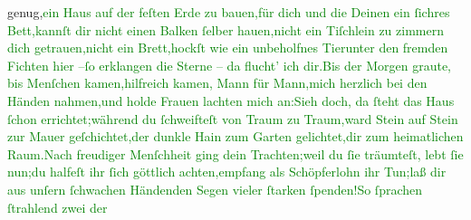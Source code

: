 {                     genug,}{}\ledrightnote{\textcolor{green}{Das Haus des Dichters}}\newverse{}\textcolor{green}{ein Haus auf der feſten Erde zu bauen,}{}\ledrightnote{\textcolor{green}{Das Haus des Dichters}}\newverse{}\textcolor{green}{für dich und die Deinen ein ſichres Bett,}{}\ledrightnote{\textcolor{green}{Das Haus des Dichters}}\newverse{}\textcolor{green}{kannſt dir nicht einen Balken ſelber hauen,}{}\ledrightnote{\textcolor{green}{Das Haus des Dichters}}\newverse{}\textcolor{green}{nicht ein Tiſchlein zu zimmern dich getrauen,}{}\ledrightnote{\textcolor{green}{Das Haus des Dichters}}\newverse{}\textcolor{green}{nicht ein Brett,}{}\ledrightnote{\textcolor{green}{Das Haus des Dichters}}\newverse{}\textcolor{green}{hockſt wie ein unbeholfnes Tier}{}\ledrightnote{\textcolor{green}{Das Haus des Dichters}}\newverse{}\textcolor{green}{unter den fremden Fichten hier –}{}\ledrightnote{\textcolor{green}{Das Haus des Dichters}}\newverse{}\textcolor{green}{ſo erklangen die Sterne – da flucht’ ich dir.}{}\ledrightnote{\textcolor{green}{Das Haus des Dichters}}\newverse{}\textcolor{green}{Bis der Morgen graute, bis Menſchen kamen,}{}\ledrightnote{\textcolor{green}{Das Haus des Dichters}}\newverse{}\textcolor{green}{hilfreich kamen, Mann für Mann,}{}\ledrightnote{\textcolor{green}{Das Haus des Dichters}}\newverse{}\textcolor{green}{mich herzlich bei den Händen nahmen,}{}\ledrightnote{\textcolor{green}{Das Haus des Dichters}}\newverse{}\textcolor{green}{und holde Frauen lachten mich an:}{}\ledrightnote{\textcolor{green}{Das Haus des Dichters}}\newverse{}\textcolor{green}{Sieh doch, da ſteht das Haus ſchon errichtet;}{}\ledrightnote{\textcolor{green}{Das Haus des Dichters}}\newverse{}\textcolor{green}{während du ſchweifteſt von Traum zu Traum,}{}\ledrightnote{\textcolor{green}{Das Haus des Dichters}}\newverse{}\textcolor{green}{ward Stein auf Stein zur Mauer geſchichtet,}{}\ledrightnote{\textcolor{green}{Das Haus des Dichters}}\newverse{}\textcolor{green}{der dunkle Hain zum Garten gelichtet,}{}\ledrightnote{\textcolor{green}{Das Haus des Dichters}}\newverse{}\textcolor{green}{dir zum heimatlichen Raum.}{}\ledrightnote{\textcolor{green}{Das Haus des Dichters}}\newverse{}\textcolor{green}{Nach freudiger Menſchheit ging dein Trachten;}{}\ledrightnote{\textcolor{green}{Das Haus des Dichters}}\newverse{}\textcolor{green}{weil du ſie träumteſt, lebt ſie nun;}{}\ledrightnote{\textcolor{green}{Das Haus des Dichters}}\newverse{}\textcolor{green}{du halfeſt ihr ſich göttlich achten,}{}\ledrightnote{\textcolor{green}{Das Haus des Dichters}}\newverse{}\textcolor{green}{empfang als Schöpferlohn ihr Tun;}{}\ledrightnote{\textcolor{green}{Das Haus des Dichters}}\newverse{}\textcolor{green}{laß dir aus unſern ſchwachen Händen}{}\ledrightnote{\textcolor{green}{Das Haus des Dichters}}\newverse{}\textcolor{green}{den Segen vieler ſtarken ſpenden!}{}\ledrightnote{\textcolor{green}{Das Haus des Dichters}}\newverse{}\textcolor{green}{{\pb}So ſprachen ſtrahlend zwei der
}
